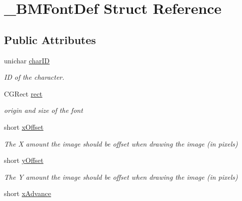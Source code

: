 \hypertarget{struct___b_m_font_def}{\section{\-\_\-\-B\-M\-Font\-Def Struct Reference}
\label{struct___b_m_font_def}
}
\subsection*{Public Attributes}
\begin{DoxyCompactItemize}
\item 
\hypertarget{struct___b_m_font_def_a59587fddd4b26a5f97831512cfd374d2}{unichar \hyperlink{struct___b_m_font_def_a59587fddd4b26a5f97831512cfd374d2}{char\-I\-D}}\label{struct___b_m_font_def_a59587fddd4b26a5f97831512cfd374d2}

\begin{DoxyCompactList}\small\item\em I\-D of the character. \end{DoxyCompactList}\item 
\hypertarget{struct___b_m_font_def_a7759a627f21934a4b8915099a15be5f8}{C\-G\-Rect \hyperlink{struct___b_m_font_def_a7759a627f21934a4b8915099a15be5f8}{rect}}\label{struct___b_m_font_def_a7759a627f21934a4b8915099a15be5f8}

\begin{DoxyCompactList}\small\item\em origin and size of the font \end{DoxyCompactList}\item 
\hypertarget{struct___b_m_font_def_af961a67faba7abff4c31ef69b32eaed4}{short \hyperlink{struct___b_m_font_def_af961a67faba7abff4c31ef69b32eaed4}{x\-Offset}}\label{struct___b_m_font_def_af961a67faba7abff4c31ef69b32eaed4}

\begin{DoxyCompactList}\small\item\em The X amount the image should be offset when drawing the image (in pixels) \end{DoxyCompactList}\item 
\hypertarget{struct___b_m_font_def_ae0d9c0fc84b157abd9133b6bcddab2b7}{short \hyperlink{struct___b_m_font_def_ae0d9c0fc84b157abd9133b6bcddab2b7}{y\-Offset}}\label{struct___b_m_font_def_ae0d9c0fc84b157abd9133b6bcddab2b7}

\begin{DoxyCompactList}\small\item\em The Y amount the image should be offset when drawing the image (in pixels) \end{DoxyCompactList}\item 
\hypertarget{struct___b_m_font_def_af8a9e2733f5f1fcb8a3631b3886d6703}{short \hyperlink{struct___b_m_font_def_af8a9e2733f5f1fcb8a3631b3886d6703}{x\-Advance}}\label{struct___b_m_font_def_af8a9e2733f5f1fcb8a3631b3886d6703}


\end{DoxyCompactItemize}
